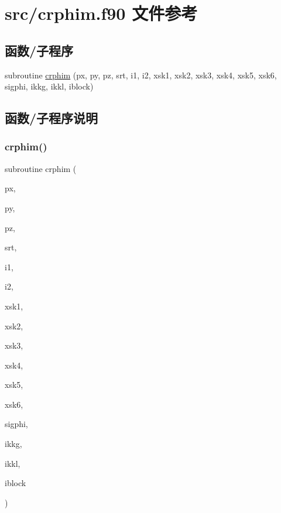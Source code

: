 \hypertarget{crphim_8f90}{}\section{src/crphim.f90 文件参考}
\label{crphim_8f90}
\subsection*{函数/子程序}
\begin{DoxyCompactItemize}
\item 
subroutine \mbox{\hyperlink{crphim_8f90_acf594bc7111627995fad1468b3677a37}{crphim}} (px, py, pz, srt, i1, i2, xsk1, xsk2, xsk3, xsk4, xsk5, xsk6, sigphi, ikkg, ikkl, iblock)
\end{DoxyCompactItemize}


\subsection{函数/子程序说明}
\mbox{\label{crphim_8f90_acf594bc7111627995fad1468b3677a37}} 
\subsubsection{\texorpdfstring{crphim()}{crphim()}}
{\footnotesize\ttfamily subroutine crphim (\begin{DoxyParamCaption}\item[{}]{px,  }\item[{}]{py,  }\item[{}]{pz,  }\item[{}]{srt,  }\item[{}]{i1,  }\item[{}]{i2,  }\item[{}]{xsk1,  }\item[{}]{xsk2,  }\item[{}]{xsk3,  }\item[{}]{xsk4,  }\item[{}]{xsk5,  }\item[{}]{xsk6,  }\item[{}]{sigphi,  }\item[{}]{ikkg,  }\item[{}]{ikkl,  }\item[{}]{iblock }\end{DoxyParamCaption})}



